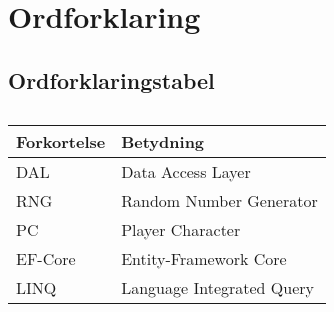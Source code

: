 \section{Ordforklaring}

\subsection{Ordforklaringstabel}
\begin{table}[H]
\caption{}
\label{tab:}
\begin{tabular}{|p{5cm}|p{5cm}|}
\hline
Forkortelse & Betydning\\
\hline
DAL & Data Access Layer\\
\hline
RNG & Random Number Generator\\
\hline
PC & Player Character\\
\hline
EF-Core & Entity-Framework Core\\
\hline
LINQ & Language Integrated Query\\
\hline
\end{tabular}
\end{table}